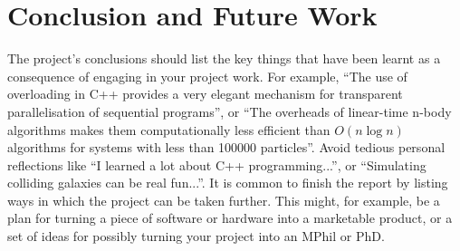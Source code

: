 \chapter{Conclusion and Future Work}
\label{chap:conclusion}

The project's conclusions should list the key things that have been learnt as a consequence of engaging in your project work. For example, ``The use of overloading in C++ provides a very elegant mechanism for transparent parallelisation of sequential programs'', or ``The overheads of linear-time n-body algorithms makes them computationally less efficient than $O(n \log n)$ algorithms for systems with less than 100000 particles''. Avoid tedious personal reflections like ``I learned a lot about C++ programming...'', or ``Simulating colliding galaxies can be real fun...''. It is common to finish the report by listing ways in which the project can be taken further. This might, for example, be a plan for turning a piece of software or hardware into a marketable product, or a set of ideas for possibly turning your project into an MPhil or PhD.

